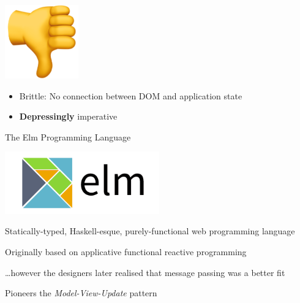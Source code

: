 \documentclass[11.5pt, aspectratio=169]{beamer}
\begin{document}
\begin{frame}[plain]
  \begin{center}
    \includegraphics{images/boo.png}
  \end{center}

  {\Large
    \begin{itemize}
      \item Brittle: No connection between DOM and application state
      \item \textbf{Depressingly} imperative
    \end{itemize}
  }
\end{frame}


\begin{frame}{The Elm Programming Language}

  \begin{center}
    \includegraphics[width=0.5\textwidth]{images/ElmLogo.png}
  \end{center}

  \begin{fullpageitemize}
  \item Statically-typed, Haskell-esque, purely-functional web programming language
  \item Originally based on applicative functional reactive programming
    \begin{itemize}
      \itemR \ldots however the designers later realised that message passing was a better fit
    \end{itemize}
    \item Pioneers the \emph{Model-View-Update} pattern
  \end{fullpageitemize}
\end{frame}
\end{document}
